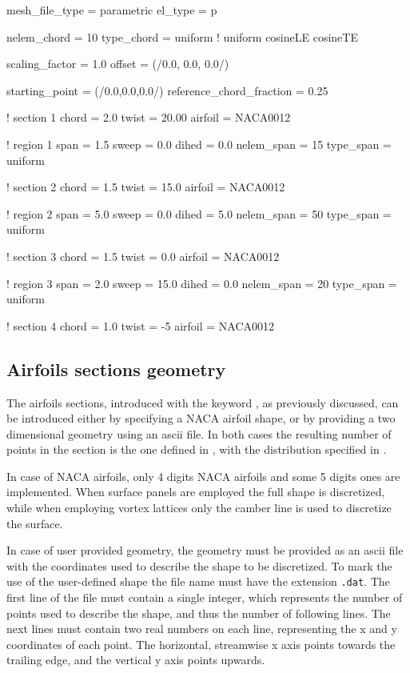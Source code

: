 \begin{inputfile}[frame=single, caption={Parametric geometry for figure \ref{fig:parametric_sections}}, label={file:parametric_example_file.in}]
mesh_file_type = parametric
el_type = p

nelem_chord = 10
type_chord = uniform   ! uniform  cosineLE  cosineTE

scaling_factor = 1.0
offset = (/0.0, 0.0, 0.0/)

starting_point = (/0.0,0.0,0.0/)
reference_chord_fraction = 0.25

! section 1
chord = 2.0
twist = 20.00
airfoil = NACA0012

! region  1
span = 1.5
sweep = 0.0
dihed = 0.0
nelem_span = 15
type_span = uniform

! section 2
chord = 1.5
twist = 15.0
airfoil = NACA0012

! region  2
span = 5.0
sweep = 0.0
dihed = 5.0
nelem_span = 50
type_span = uniform

! section 3
chord = 1.5
twist = 0.0
airfoil = NACA0012

! region  3
span = 2.0
sweep = 15.0
dihed = 0.0
nelem_span = 20
type_span = uniform

! section 4
chord = 1.0
twist = -5
airfoil = NACA0012
\end{inputfile}


\subsection{Airfoils sections geometry}
The airfoils sections, introduced with the keyword , as previously discussed, can be introduced either by specifying a NACA airfoil shape, or by providing a two dimensional geometry using an ascii file. In both cases the resulting number of points in the section is the one defined in , with the distribution specified in . 

In case of NACA airfoils, only 4 digits NACA airfoils and some 5 digits ones are implemented. When surface panels are employed the full shape is discretized, while when employing vortex lattices only the camber line is used to discretize the surface. 

In case of user provided geometry, the geometry must be provided as an ascii file with the coordinates used to describe the shape to be discretized. To mark the use of the user-defined shape the file name must have the extension \texttt{.dat}. 
The first line of the file must contain a single integer, which represents the number of points used to describe the shape, and thus the number of following lines. 
The next lines must contain two real numbers on each line, representing the x and y coordinates of each point. The horizontal, streamwise x axis points  towards the trailing edge, and the vertical y axis points upwards. 

